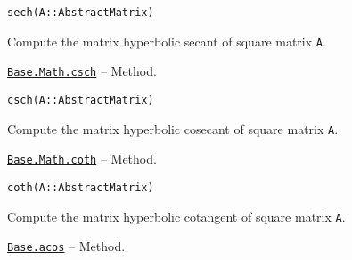 \begin{adjustwidth}{2em}{0pt}


\begin{verbatim}
sech(A::AbstractMatrix)
\end{verbatim}

Compute the matrix hyperbolic secant of square matrix \texttt{A}.



\end{adjustwidth}
\hypertarget{3919915635430069730}{}
\hyperlink{3919915635430069730}{\texttt{Base.Math.csch}}  -- {Method.}

\begin{adjustwidth}{2em}{0pt}


\begin{verbatim}
csch(A::AbstractMatrix)
\end{verbatim}

Compute the matrix hyperbolic cosecant of square matrix \texttt{A}.



\end{adjustwidth}
\hypertarget{17844450768888024404}{}
\hyperlink{17844450768888024404}{\texttt{Base.Math.coth}}  -- {Method.}

\begin{adjustwidth}{2em}{0pt}


\begin{verbatim}
coth(A::AbstractMatrix)
\end{verbatim}

Compute the matrix hyperbolic cotangent of square matrix \texttt{A}.



\end{adjustwidth}
\hypertarget{5331820114793939779}{}
\hyperlink{5331820114793939779}{\texttt{Base.acos}}  -- {Method.}

